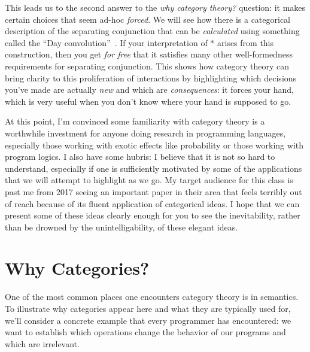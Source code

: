 This leads us to the second answer to the \emph{why category theory?}
question: it makes certain choices that seem ad-hoc \emph{forced}.  We will see
how there is a categorical description of the separating
conjunction that can be \emph{calculated} using something called the ``Day
convolution''~\citep{dongol2016convolution,biering2007bi}.
If your 
interpretation of $*$ arises from this construction, then you get \emph{for free}
that it satisfies many other well-formedness requirements for separating conjunction.
This shows how category 
theory can bring clarity to this 
proliferation of interactions by highlighting which decisions you've made 
are actually \emph{new} and which are \emph{consequences}: it forces your hand,
which is very useful when you don't know where your hand is supposed to go.

At this point, I'm convinced some familiarity with category theory 
is a worthwhile investment for anyone doing research in programming 
languages, especially those working with exotic effects like 
probability or those working with program logics. I also have some hubris: 
I believe that it is not so hard to understand, especially if one 
is sufficiently motivated by some of the applications that we will 
attempt to highlight as we go.
My target audience for this class is past me from 2017 seeing an important 
paper in their area that feels terribly out of reach because of its 
fluent application of categorical ideas. I hope that we can 
present some of these ideas clearly enough for you to see the inevitability, 
rather than be drowned by the unintelligability, of these elegant ideas.

\chapter{Why Categories?} \label{sec:semantics-of-programs}

One of the most common places one encounters category theory is in semantics. To
illustrate why categories appear here and what they are typically used for,
we'll consider a concrete example that every programmer has encountered: 
we want to establish which operations change the behavior of our programs
and which are irrelevant.

